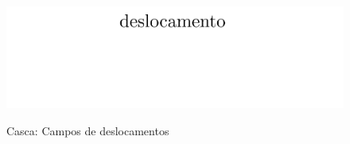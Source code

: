 \documentclass[tese_patricia]{subfiles}
\begin{document}
\begin{figure}[!htb]
	{\includegraphics[scale=0.015,trim=0cm 20.0cm 0cm 0cm, clip=true]{Imagens/Cap4/casca_legenda.pdf}}
	\caption{Casca: Campos de deslocamentos}
	\label{fig:casca_campos_deslocamentos}
\end{figure}
\end{document}

